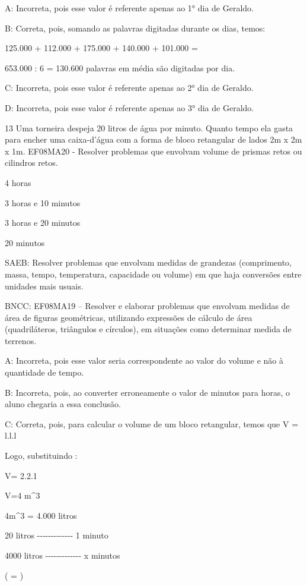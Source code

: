 {A: Incorreta, pois esse valor é referente apenas ao 1° dia de Geraldo.

B: Correta, pois, somando as palavras digitadas durante os dias, temos:

125.000 + 112.000 + 175.000 + 140.000 + 101.000 =

653.000 : 6 = 130.600 palavras em média são digitadas por dia.

C: Incorreta, pois esse valor é referente apenas ao 2° dia de Geraldo.

D: Incorreta, pois esse valor é referente apenas ao 3° dia de Geraldo.

\num{13} Uma torneira despeja 20 litros de água por minuto. Quanto tempo ela
gasta para encher uma caixa-d'água com a forma de bloco retangular de
lados 2m x 2m x 1m. EF08MA20 - Resolver problemas que envolvam volume de
prismas retos ou cilindros retos.
\item 4 horas
\item 3 horas e 10 minutos
\item 3 horas e 20 minutos
\item 20 minutos

SAEB: Resolver problemas que envolvam medidas de grandezas (comprimento,
massa, tempo, temperatura, capacidade ou volume) em que haja conversões
entre unidades mais usuais.

BNCC: EF08MA19 -- Resolver e elaborar problemas que envolvam medidas de
área de figuras geométricas, utilizando expressões de cálculo de área
(quadriláteros, triângulos e círculos), em situações como determinar
medida de terrenos.

A: Incorreta, pois esse valor seria correspondente ao valor do volume e
não à quantidade de tempo.

B: Incorreta, pois, ao converter erroneamente o valor de minutos para
horas, o aluno chegaria a essa conclusão.

C: Correta, pois, para calcular o volume de um bloco retangular, temos
que V = l.l.l

Logo, substituindo :

V= 2.2.1

V=4 m^3

4m^3 = 4.000 litros

20 litros -\/-\/-\/-\/-\/-\/-\/-\/-\/-\/-\/-\/- 1 minuto

4000 litros -\/-\/-\/-\/-\/-\/-\/-\/-\/-\/-\/-\/- x minutos

( = )

}
